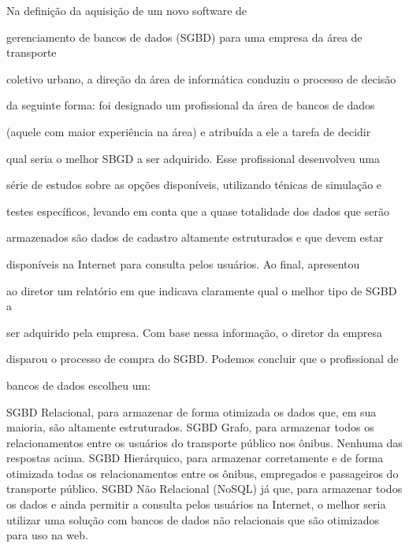 \documentclass[12pt, addpoints]{exam}
\begin{document}
    \begin{questions}

    \newpage
    \question

Na definição da aquisição de um novo software de

gerenciamento de bancos de dados (SGBD) para uma empresa da área de transporte 

coletivo urbano, a direção da área de informática conduziu o processo de decisão

da seguinte forma: foi designado um profissional da área de bancos de dados

(aquele com maior experiência na área) e atribuída a ele a tarefa de decidir

qual seria o melhor SBGD a ser adquirido. Esse profissional desenvolveu uma

série de estudos sobre as opções disponíveis, utilizando ténicas de simulação e

testes específicos, levando em conta que a quase totalidade dos dados que serão

armazenados são dados de cadastro altamente estruturados e que devem estar

disponíveis na Internet para consulta pelos usuários. Ao final, apresentou

ao diretor um relatório em que indicava claramente qual o melhor tipo de SGBD a

ser adquirido pela empresa. Com base nessa informação, o diretor da empresa

disparou o processo de compra do SGBD. Podemos concluir que o profissional de

bancos de dados escolheu um:
\begin{choices}
\choice SGBD Relacional, para armazenar de forma otimizada os dados que, em sua maioria, são altamente estruturados.
\choice SGBD Grafo, para armazenar todos os relacionamentos entre os usuários do transporte público nos ônibus.
\choice Nenhuma das respostas acima.
\choice SGBD Hierárquico, para armazenar corretamente e de forma otimizada todas os relacionamentos entre os ônibus, empregados e passageiros do transporte público.
\choice SGBD Não Relacional (NoSQL) já que, para armazenar todos os dados e ainda permitir a consulta pelos usuários na Internet, o melhor seria utilizar uma solução com bancos de dados não relacionais que são otimizados para uso na web.
\end{choices}


\end{questions}
\end{document}
